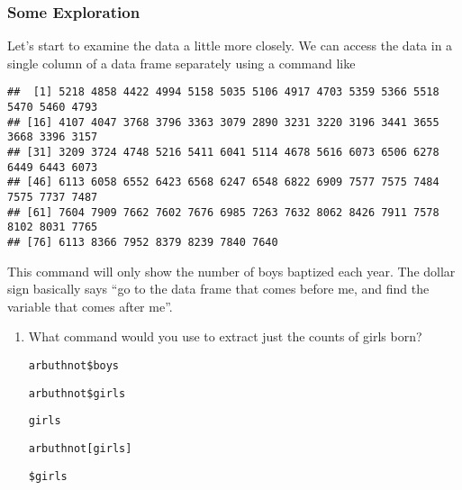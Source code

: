 \documentclass[
]{article}
\newenvironment{Shaded}{\begin{snugshade}}{\end{snugshade}}
\newcommand{\CommentTok}[1]{\textcolor[rgb]{0.56,0.35,0.01}{\textit{#1}}}
\newcommand{\NormalTok}[1]{#1}
\newcommand{\SpecialCharTok}[1]{\textcolor[rgb]{0.81,0.36,0.00}{\textbf{#1}}}
\providecommand{\tightlist}{%
  \setlength{\itemsep}{0pt}\setlength{\parskip}{0pt}}
\begin{document}
\subsubsection{Some Exploration}\label{some-exploration}

Let's start to examine the data a little more closely. We can access the
data in a single column of a data frame separately using a command like

\begin{Shaded}
\end{Shaded}

\begin{verbatim}
##  [1] 5218 4858 4422 4994 5158 5035 5106 4917 4703 5359 5366 5518 5470 5460 4793
## [16] 4107 4047 3768 3796 3363 3079 2890 3231 3220 3196 3441 3655 3668 3396 3157
## [31] 3209 3724 4748 5216 5411 6041 5114 4678 5616 6073 6506 6278 6449 6443 6073
## [46] 6113 6058 6552 6423 6568 6247 6548 6822 6909 7577 7575 7484 7575 7737 7487
## [61] 7604 7909 7662 7602 7676 6985 7263 7632 8062 8426 7911 7578 8102 8031 7765
## [76] 6113 8366 7952 8379 8239 7840 7640
\end{verbatim}

This command will only show the number of boys baptized each year. The
dollar sign basically says ``go to the data frame that comes before me,
and find the variable that comes after me''.

\begin{enumerate}
\def\labelenumi{\arabic{enumi}.}
\setcounter{enumi}{1}
\tightlist
\item
  What command would you use to extract just the counts of girls born?

  \texttt{arbuthnot\$boys}

  \texttt{arbuthnot\$girls}

  \texttt{girls}

  \texttt{arbuthnot{[}girls{]}}

  \texttt{\$girls}
\end{enumerate}

\begin{Shaded}
\end{Shaded}
\end{document}
